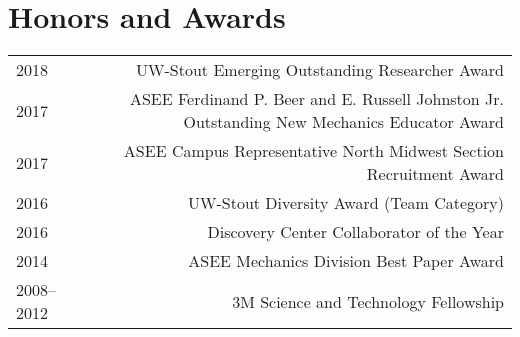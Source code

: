 \section*{Honors and Awards}
\begin{tabular}{L!{\VRule}R}
2018&UW-Stout Emerging Outstanding Researcher Award\\
2017&ASEE Ferdinand P. Beer and E. Russell Johnston Jr. Outstanding New Mechanics Educator Award\\
2017&ASEE Campus Representative North Midwest Section Recruitment Award\\
2016&UW-Stout Diversity Award (Team Category)\\
2016&Discovery Center Collaborator of the Year\\
2014&ASEE Mechanics Division Best Paper Award\\
2008--2012&3M Science and Technology Fellowship\\
\end{tabular}